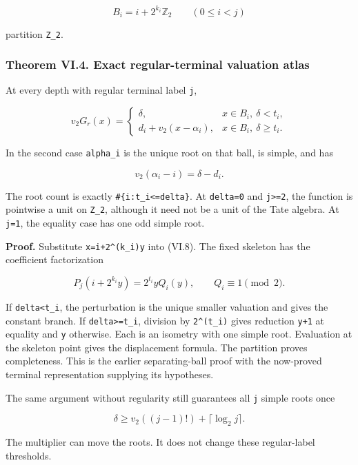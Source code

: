 \documentclass[11pt,letterpaper]{article}
\begin{document}
\[
B_i=i+2^{k_i}\mathbb Z_2\qquad(0\le i<j)
\]

partition \texttt{Z\_2}.

\subsubsection{Theorem VI.4. Exact regular-terminal valuation atlas}\label{theorem-vi.4.-exact-regular-terminal-valuation-atlas}

At every depth with regular terminal label \texttt{j},

\[
\boxed{v_2G_r(x)=
\begin{cases}
\delta,&x\in B_i,\ \delta<t_i,\\
d_i+v_2(x-\alpha_i),&x\in B_i,\ \delta\ge t_i.
\end{cases}} \tag{VI.9}
\]

In the second case \texttt{alpha\_i} is the unique root on that ball, is simple, and has

\[
v_2(\alpha_i-i)=\delta-d_i.
\]

The root count is exactly \texttt{\#\{i:t\_i\textless{}=delta\}}. At \texttt{delta=0} and \texttt{j\textgreater{}=2}, the function is pointwise a unit on \texttt{Z\_2}, although it need not be a unit of the Tate algebra. At \texttt{j=1}, the equality case has one odd simple root.

\textbf{Proof.} Substitute \texttt{x=i+2\^{}(k\_i)y} into (VI.8). The fixed skeleton has the coefficient factorization

\[
P_j(i+2^{k_i}y)=2^{t_i}yQ_i(y),\qquad Q_i\equiv1\pmod2.
\]

If \texttt{delta\textless{}t\_i}, the perturbation is the unique smaller valuation and gives the constant branch. If \texttt{delta\textgreater{}=t\_i}, division by \texttt{2\^{}(t\_i)} gives reduction \texttt{y+1} at equality and \texttt{y} otherwise. Each is an isometry with one simple root. Evaluation at the skeleton point gives the displacement formula. The partition proves completeness. This is the earlier separating-ball proof with the now-proved terminal representation supplying its hypotheses.

The same argument without regularity still guarantees all \texttt{j} simple roots once

\[
\boxed{\delta\ge v_2((j-1)!)+\lceil\log_2j\rceil.} \tag{VI.10}
\]

The multiplier can move the roots. It does not change these regular-label thresholds.
\end{document}
